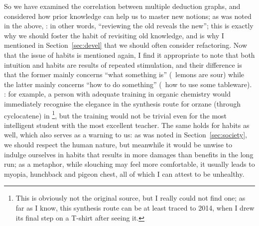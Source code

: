 So we have examined the correlation between multiple deduction graphs, and
considered how prior knowledge can help us to master new notions; as was noted
in the above, : in other words, ``reviewing the old reveals the new''; this is
exactly why we should foster the habit of revisiting old knowledge, and is why I
mentioned in Section~\ref{sec:devel} that we should often consider refactoring.
Now that the issue of habits is mentioned again, I find it appropriate to note
that both intuition and habits are results of repeated stimulation, and their
difference is that the former mainly concerns ``what something is'' (\eg~lemons
are sour) while the latter mainly concerns ``how to do something'' (\eg~how to
use some tableware).  : for example, a person with
adequate training in organic chemistry would immediately recognise the
elegance in the synthesis route for orzane (through cyclocatene) in \parencite%
{zxhxy2018}\footnote{This is obviously not the original source, but I really
could not find one; as far as I know, this synthesis route can be at least
traced to 2014, when I drew its final step on a T-shirt after seeing it.},
but the training would not be trivial even for the most intelligent student
with the most excellent teacher.  The same holds for habits as well, which also
serves as a warning to us: as was noted in Section~\ref{sec:society}, we should
respect the human nature, but meanwhile it would be unwise to indulge ourselves
in habits that results in more damages than benefits in the long run; as a
metaphor, while slouching may feel more comfortable, it usually leads to
myopia, hunchback and pigeon chest, all of which I can attest to be unhealthy.

